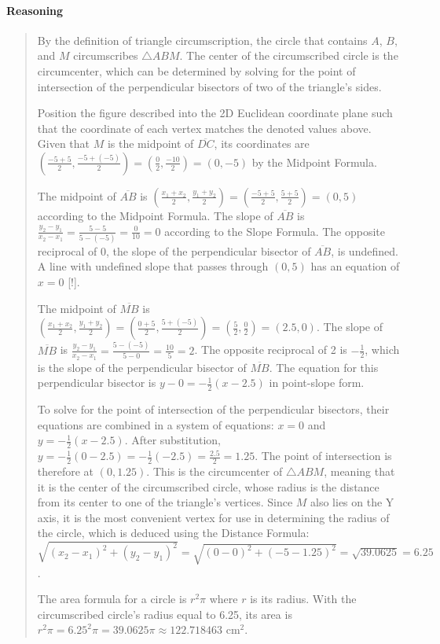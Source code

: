 \documentclass[letterpaper,12pt,twoside]{report}
\begin{document}
	\paragraph{Reasoning}
	\begin{quotation}
		
		By the definition of triangle circumscription, the circle that contains $A$, $B$, and $M$ circumscribes $\triangle ABM$. The center of the circumscribed circle is the circumcenter, which can be determined by solving for the point of intersection of the perpendicular bisectors of two of the triangle's sides.
		
		Position the figure described into the 2D Euclidean coordinate plane such that the coordinate of each vertex matches the denoted values above. Given that $M$ is the midpoint of $\overline{DC}$, its coordinates are $(\frac{-5+5}{2},\frac{-5+(-5)}{2})=(\frac{0}{2},\frac{-10}{2})=(0,-5)$ by the Midpoint Formula.
				
		The midpoint of $\overline{AB}$ is $(\frac{x_1+x_2}{2},\frac{y_1+y_2}{2})=(\frac{-5+5}{2},\frac{5+5}{2})=(0,5)$ according to the Midpoint Formula. The slope of $\overline{AB}$ is $\frac{y_2-y_1}{x_2-x_1}=\frac{5-5}{5-(-5)}=\frac{0}{10}=0$ according to the Slope Formula. The opposite reciprocal of 0, the slope of the perpendicular bisector of $\overline{AB}$, is undefined. A line with undefined slope that passes through $(0,5)$ has an equation of $x=0$ [!].
		
		The midpoint of $\overline{MB}$ is $(\frac{x_1+x_2}{2},\frac{y_1+y_2}{2})=(\frac{0+5}{2},\frac{5+(-5)}{2})=(\frac{5}{2},\frac{0}{2})=(2.5,0)$. The slope of $\overline{MB}$ is $\frac{y_2-y_1}{x_2-x_1}=\frac{5-(-5)}{5-0}=\frac{10}{5}=2$. The opposite reciprocal of 2 is $-\frac{1}{2}$, which is the slope of the perpendicular bisector of $\overline{MB}$. The equation for this perpendicular bisector is $y-0=-\frac{1}{2}(x-2.5)$ in point-slope form.
		
		To solve for the point of intersection of the perpendicular bisectors, their equations are combined in a system of equations: $x=0$ and $y=-\frac{1}{2}(x-2.5)$. After substitution, $y=-\frac{1}{2}(0-2.5)=-\frac{1}{2}(-2.5)=\frac{2.5}{2}=1.25$. The point of intersection is therefore at $(0,1.25)$. This is the circumcenter of $\triangle ABM$, meaning that it is the center of the circumscribed circle, whose radius is the distance from its center to one of the triangle's vertices. Since $M$ also lies on the Y axis, it is the most convenient vertex for use in determining the radius of the circle, which is deduced using the Distance Formula: $\sqrt{(x_2-x_1)^2+(y_2-y_1)^2}=\sqrt{(0-0)^2+(-5-1.25)^2}=\sqrt{39.0625}=6.25$.
		
		The area formula for a circle is $r^2 \pi$ where $r$ is its radius. With the circumscribed circle's radius equal to 6.25, its area is $r^2\pi=6.25^2\pi=\boxed{39.0625\pi\approx 122.718463 \text{  cm}^2}$.
		
	\end{quotation}
	
\end{document}

